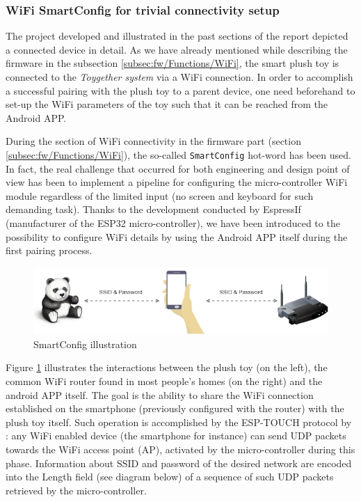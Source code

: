\vspace{0.5cm}

\vspace{0.5cm}


\subsubsection{WiFi SmartConfig for trivial connectivity setup}
\label{subsubsec:android-smartconfig} 

The project developed and illustrated in the past sections of the report depicted a connected device in detail. As we have already mentioned while describing the firmware in the subsection \ref{subsec:fw/Functions/WiFi}, the smart plush toy is connected to the \textit{Toygether system} via a WiFi connection. In order to accomplish a successful pairing with the plush toy to a parent device, one need beforehand to set-up the WiFi parameters of the toy such that it can be reached from the Android APP.

\medskip
During the section of WiFi connectivity in the firmware part (section \ref{subsec:fw/Functions/WiFi}), the so-called \texttt{SmartConfig} hot-word has been used. In fact, the real challenge that occurred for both engineering and design point of view has been to implement a pipeline for configuring the micro-controller WiFi module regardless of the limited input (no screen and keyboard for such demanding task). Thanks to the development conducted by EspressIf (manufacturer of the ESP32 micro-controller), we have been introduced to the possibility to configure WiFi details by using the Android APP itself during the first pairing process.

\begin{figure}[ht]
    \centering
    \includegraphics[scale=0.55]{images/SE_android_smartconfig.png}
    \caption{SmartConfig illustration}
    \label{fig:SE_UML_android_smartconfig}
\end{figure}

Figure \ref{fig:SE_UML_android_smartconfig} illustrates the interactions between the plush toy (on the left), the common WiFi router found in most people's homes (on the right) and the android APP itself. The goal is the ability to share the WiFi connection established on the smartphone (previously configured with the router) with the plush toy itself. Such operation is accomplished by the ESP-TOUCH protocol by \textcite{smartconfigDoc}: any WiFi enabled device (the smartphone for instance) can send UDP packets towards the WiFi access point (AP), activated by the micro-controller during this phase. Information about SSID and password of the desired network are encoded into the Length field (see diagram below) of a sequence of such UDP packets retrieved by the micro-controller.

